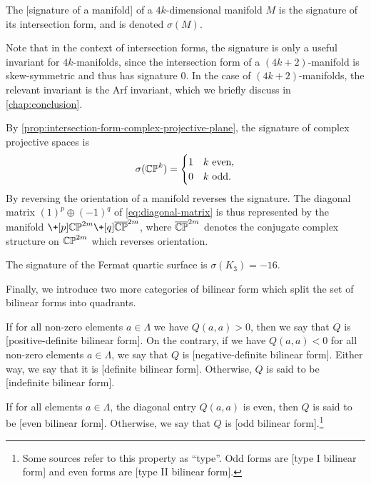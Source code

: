 \begin{definition}
	The [signature of a manifold] of a $4k$-dimensional manifold $M$ is the signature of its intersection form, and is denoted $\sigma(M)$.
\end{definition}

\begin{remark*}
	Note that in the context of intersection forms, the signature is only a useful invariant for $4k$-manifolds, since the intersection form of a $(4k+2)$-manifold is skew-symmetric and thus has signature $0$. In the case of $(4k+2)$-manifolds, the relevant invariant is the Arf invariant, which we briefly discuss in \cref{chap:conclusion}.
\end{remark*}

\begin{example}
	By \cref{prop:intersection-form-complex-projective-plane}, the signature of complex projective spaces is
	\[
		\sigma(\mathbb{CP}^k)=\begin{cases}1 & k\textrm{ even},\\ 0 & k\textrm{ odd}.\end{cases}
	\]
	By reversing the orientation of a manifold reverses the signature. The diagonal matrix $(1)^p\oplus (-1)^q$ of \cref{eq:diagonal-matrix} is thus represented by the manifold $\+[p] \CP^{2m} \+[q] \overline{\CP}^{2m}$, where $\overline{\mathbb{CP}}^{2m}$ denotes the conjugate complex structure on $\mathbb{CP}^{2m}$ which reverses orientation.
\end{example}

\begin{example}
	The signature of the Fermat quartic surface is $\sigma(K_3)=-16$.
\end{example}

Finally, we introduce two more categories of bilinear form which split the set of bilinear forms into quadrants.

\begin{definition}
	If for all non-zero elements $a\in \Lambda$ we have $Q(a,a)>0$, then we say that $Q$ is [positive-definite bilinear form]. On the contrary, if we have $Q(a,a)<0$ for all non-zero elements $a\in \Lambda$, we say that $Q$ is [negative-definite bilinear form]. Either way, we say that it is [definite bilinear form]. Otherwise, $Q$ is said to be [indefinite bilinear form].
\end{definition}

\begin{definition}
	If for all elements $a\in \Lambda$, the diagonal entry $Q(a,a)$ is even, then $Q$ is said to be [even bilinear form]. Otherwise, we say that $Q$ is [odd bilinear form].\footnote{Some sources refer to this property as ``type''. Odd forms are [type I bilinear form] and even forms are [type II bilinear form].}
\end{definition}

